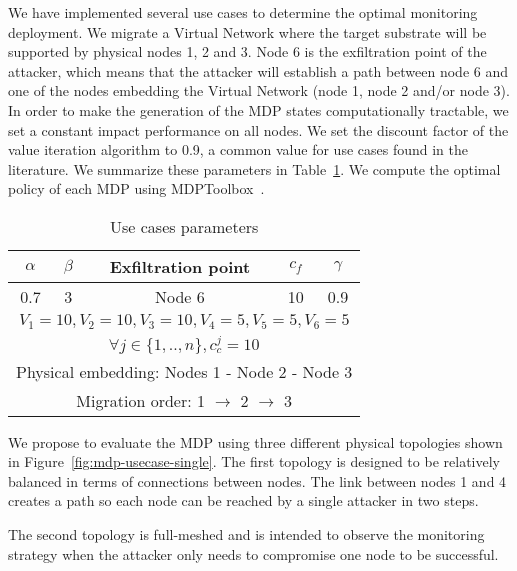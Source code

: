 We have implemented several use cases to determine the optimal monitoring deployment.
We migrate a Virtual Network where the target substrate will be supported by physical nodes 1, 2 and 3.
Node 6 is the exfiltration point of the attacker, which means that the attacker will establish a path between node 6 and one of the nodes embedding the Virtual Network (\ie node 1, node 2 and/or node 3).
In order to make the generation of the MDP states computationally tractable, we set a constant impact performance on all nodes. We set the discount factor of the value iteration algorithm to 0.9, a common value for use cases found in the literature.
We summarize these parameters in Table~\ref{tab:mdp-parameters}.
We compute the optimal policy of each MDP using MDPToolbox~\cite{Chades2014}.

\begin{table}[h]
\centering
\begin{tabular}{|c|c|l|c|c|c|}
\hline
$\alpha$ & \multicolumn{2}{c|}{$\beta$} & Exfiltration point & $c_f$ & $\gamma$ \\ \hline
0.7      & \multicolumn{2}{c|}{3}       & Node 6             & 10    & 0.9      \\ \hline
\multicolumn{6}{|c|}{$V_1=10,V_2=10,V_3=10,V_4=5,V_5=5,V_6=5$}                             \\ \hline
\multicolumn{6}{|c|}{$\forall j \in \{1,..,n\}, c_c^j=10$}                             \\ \hline
\multicolumn{6}{|l|}{Physical embedding: Nodes 1 - Node 2 - Node 3}             \\ \hline
\multicolumn{6}{|c|}{Migration order: 1 $\rightarrow$ 2 $\rightarrow$ 3}                              \\ \hline
\end{tabular}
\caption{Use cases parameters}
\label{tab:mdp-parameters}
\end{table}

We propose to evaluate the MDP using three different physical topologies shown in Figure~\ref{fig:mdp-usecase-single}. The first topology is designed to be relatively balanced in terms of connections between nodes. The link between nodes 1 and 4 creates a path so each node can be reached by a single attacker in two steps.

The second topology is full-meshed and is intended to observe the monitoring strategy when the attacker only needs to compromise one node to be successful.

